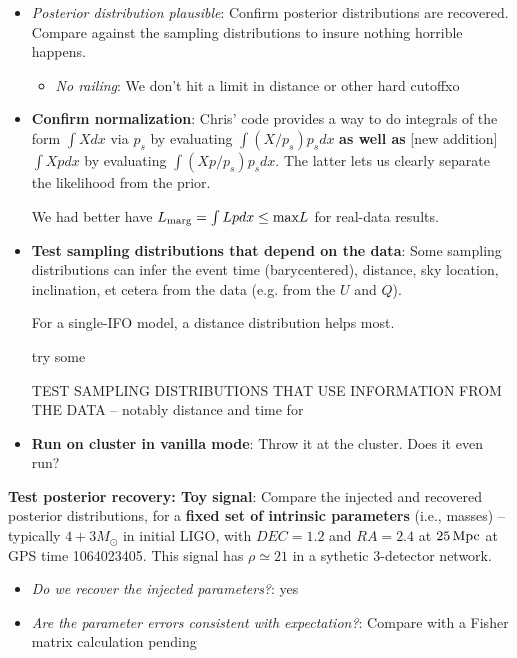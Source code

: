 \documentclass[twocolumn,prd,nofootinbib]{revtex4}
\newcommand\editremark[1]{{\color{red} #1}}
\newcommand\unit[1]{\, {\rm #1}}
\begin{document}
\begin{widetext}
\begin{itemize}
\item \emph{Posterior distribution plausible}: Confirm posterior distributions are recovered.  Compare against the
  sampling distributions to insure nothing horrible happens. 
\begin{itemize}
\item \emph{No railing}: We don't hit a limit in distance or other hard cutoffxo
\end{itemize}

\item \textbf{Confirm normalization}: Chris' code provides a way to do integrals of the form $\int X dx$ via $p_s$ by
  evaluating $\int (X/p_s)  p_s dx$ \textbf{as well as} [new addition] $\int X p dx$ by evaluating $\int (X p/p_s)p_s
  dx$.  The latter lets us clearly separate the likelihood from the prior.

We had better have $L_{\rm marg} = \int L p dx \le \text{max} L$ for real-data results.


\item  \textbf{Test sampling distributions that depend on the data}: Some sampling distributions can infer the event
  time (barycentered), distance, sky location, inclination, et cetera from the data (e.g. from the $U$ and $Q$).  

For a single-IFO model, a distance distribution helps most.

\editremark{try some}

\editremark{TEST SAMPLING DISTRIBUTIONS THAT USE INFORMATION FROM THE DATA} -- notably distance and time for 

\item \textbf{Run on cluster in vanilla mode}: Throw it at the cluster.  Does it even run?
\end{itemize}


\noindent \textbf{Test posterior recovery: Toy signal}: Compare the injected and recovered posterior distributions, for a
\textbf{fixed set of intrinsic parameters} (i.e., masses) -- typically $4+3 M_\odot$ in initial LIGO, with $DEC=1.2$ and
$RA=2.4$ at $25\unit{Mpc}$ at GPS time 1064023405.  This signal has $\rho \simeq 21$ in a sythetic 3-detector network.
\begin{itemize}
\item \emph{Do we recover the injected parameters?}: \editremark{yes}
\item \emph{Are the parameter errors consistent with expectation?}: Compare with a Fisher matrix calculation \editremark{pending}
\end{itemize}


\end{widetext}
\end{document}
